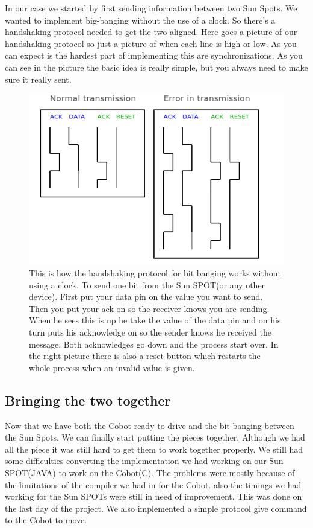\documentclass[a4,english]{article}
\begin{document}
In our case we started by first sending information between two Sun Spots. We wanted to implement big-banging without the use of a clock. So there's a handshaking protocol needed to get the two aligned. Here goes a picture of our handshaking protocol so just a picture of when each line is high or low.
As you can expect is the hardest part of implementing this are synchronizations. As you can see in the picture the basic idea is really simple, but you always need to make sure it really sent. 
\begin{figure}
\label{fig:handshaking}
\includegraphics[scale = 0.5]{handshaking.png}
\caption{This is how the handshaking protocol for bit banging works without using a clock. To send one bit from the Sun SPOT(or any other device). First put your data pin on the value you want to send. Then you put your ack on so the receiver knows you are sending. When he sees this is up he take the value of the data pin and on his turn puts his acknowledge on so the sender knows he received the message. Both acknowledges go down and the process start over. In the right picture there is also a reset button which restarts the whole process when an invalid value is given. }
\end{figure}

\subsection{Bringing the two together}
\label{subsec:together}
Now that we have both the Cobot ready to drive and the bit-banging between the Sun Spots. We can finally start putting the pieces together. Although we had all the piece it was still hard to get them to work together properly. We still had some difficulties converting the implementation we had working on our Sun SPOT(JAVA) to work on the Cobot(C). The problems were mostly because of the limitations of the compiler we had in for the Cobot. also the timings we had working for the Sun SPOTs were still in need of improvement. This was done on the last day of the project. We also implemented a simple protocol give command to the Cobot to move. 
\end{document}
